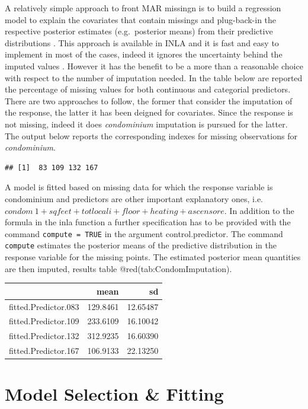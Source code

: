 \documentclass[
  12pt,
  a4paper,
  oneside]{book}
\newcommand{\passthrough}[1]{#1}
\theoremstyle{definition}
\theoremstyle{definition}
\theoremstyle{definition}
\theoremstyle{remark}
\begin{document}
A relatively simple approach to front MAR missingn is to build a regression model to explain the covariates that contain missings and plug-back-in the respective posterior estimates (e.g.~posterior means) from their predictive distributions \citet{Little}. This approach is available in INLA and it is fast and easy to implement in most of the cases, indeed it ignores the uncertainty behind the imputed values \citep{Bayesian_INLA_Rubio}. However it has the benefit to be a more than a reasonable choice with respect to the number of imputation needed. In the table below are reported the percentage of missing values for both continuous and categorial predictors. There are two approaches to follow, the former that consider the imputation of the response, the latter it has been deigned for covariates.
Since the response is not missing, indeed it does \emph{condominium} imputation is pursued for the latter. The output below reports the corresponding indexes for missing observations for \emph{condominium}.

\begin{lstlisting}
## [1]  83 109 132 167
\end{lstlisting}

A model is fitted based on missing data for which the response variable is condominium and predictors are other important explanatory ones, i.e.\(condom ~ 1 + sqfeet + totlocali + floor + heating + ascensore\). In addition to the formula in the inla function a further specification has to be provided with the command \passthrough{\lstinline!compute = TRUE!} in the argument control.predictor. The command \passthrough{\lstinline!compute!} estimates the posterior means of the predictive distribution in the response variable for the missing points. The estimated posterior mean quantities are then imputed, results table @red(tab:CondomImputation).

\begin{tabular}{lrr}
\toprule
  & mean & sd\\
\midrule
fitted.Predictor.083 & 129.8461 & 12.65487\\
fitted.Predictor.109 & 233.6109 & 16.10042\\
fitted.Predictor.132 & 312.9235 & 16.60390\\
fitted.Predictor.167 & 106.9133 & 22.13250\\
\bottomrule
\end{tabular}

\hypertarget{modelspec}{%
\chapter{Model Selection \& Fitting}\label{modelspec}}
\end{document}
